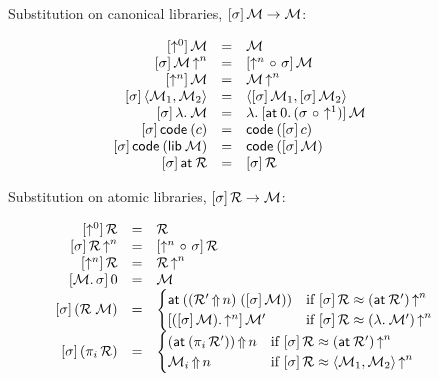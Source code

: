 \documentclass[11pt]{article}
\begin{document}
\begin{figure}
  \begin{description}
  \item[Substitution on canonical libraries, $[{\sigma}]\,{\mathcal{M}} \to \mathcal{M}$:]
    \[\begin{array}{rcl}
      \esub{\sid}{\M} &=& \M\\
      \esub{\sigma}{\lift{\M}{n}} &=& \esub{\shift{n} \o \sigma}{\M}\\
      \esub{\shift{n}}{\M} &=& \lift{\M}{n}\\
      \esub{\sigma}{\<\M_1,\M_2\>} &=& \<\esub{\sigma}{\M_1}, \esub{\sigma}{\M_2}\>\\
      \esub{\sigma}{\ulam{}{\M}} &=&
      \ulam{}{\esub{\at{0} \cons (\sigma \o \shift{1})}{\M}}\\
      \esub{\sigma}{\code{(c)}} &=& \code{(\esub{\sigma}{c})}\\
      \esub{\sigma}{\code{(\lib{\M})}} &=& \code{(\esub{\sigma}{\M})}\\
      \esub{\sigma}{\at{\R}} &=& \esub{\sigma}{\R}\\
    \end{array}\]

  \item[Substitution on atomic libraries, $[{\sigma}]\,{\mathcal{R}} \to \mathcal{M}$:]
    \[\begin{array}{rcl}
      \esub{\sid}{\R} &=& \R\\
      \esub{\sigma}{\lift{\R}{n}} &=& \esub{\shift{n} \o \sigma}{\R}\\
      \esub{\shift{n}}{\R} &=& \lift{\R}{n}\\
      \esub{\M \cons \sigma}{0} &=& \M\\
      \esub{\sigma}{(\R \ap \M)} &=&
      \begin{cases}
        \at{((\dolift{\R'}{n}) \ap (\esub{\sigma}{\M}))}
        & \text{if}~\esub{\sigma}{\R} \approx \lift{(\at{\R'})}{n}\\
        \esub{(\esub{\sigma}{\M}) \cons \shift{n}}{\M'}
        & \text{if}~\esub{\sigma}{\R} \approx \lift{(\ulam{}{\M'})}{n}\\
      \end{cases}\\
      \esub{\sigma}{(\proj{i}{\R})} &=&
      \begin{cases}
        \dolift{(\at{(\proj{i}{\R'})})}{n}
        & \text{if}~\esub{\sigma}{\R} \approx \lift{(\at{\R'})}{n}\\
        \dolift{\M_i}{n}
        & \text{if}~\esub{\sigma}{\R} \approx \lift{\<\M_1,\M_2\>}{n}
      \end{cases}
    \end{array}\]


\end{description}
\end{figure}
\end{document}
